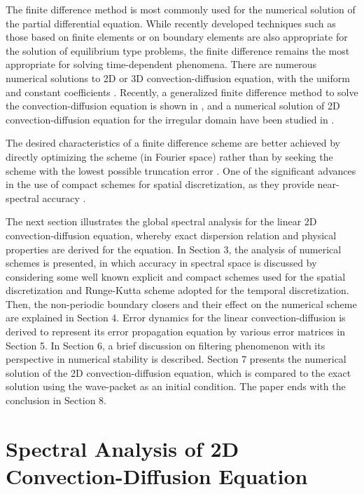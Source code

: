 \documentclass[showpacs,preprintnumbers,amsmath,amssymb]{revtex4-1} %
\begin{document}
The finite difference method is most commonly used for the numerical solution of the partial differential equation. While recently developed techniques such as those based on finite elements \cite{chen2005finite, codina2019finite} or on boundary elements \cite{katsikadelis2002boundary} are also appropriate for the solution of equilibrium type problems, the finite difference remains the most appropriate for solving time-dependent phenomena. There are numerous numerical solutions to 2D or 3D convection-diffusion equation, with the uniform and constant coefficients \cite{thongmoon2006comparison, SUMAN_et_al}. Recently, a generalized finite difference method to solve the convection-diffusion equation is shown in \cite{WANG, URENA, PRIETO}, and a numerical solution of 2D convection-diffusion equation for the irregular domain have been studied in \cite{Kusuma_et_al}.
 
The desired characteristics of a finite difference scheme are better achieved by directly optimizing the scheme (in Fourier space) rather than by seeking the scheme with the lowest possible truncation error \cite{LELE1992}. One of the significant advances in the use of compact schemes for spatial discretization, as they provide near-spectral accuracy \cite{Laizet_et_al, SENGUPTA_et_al_1}.

The next section illustrates the global spectral analysis for the linear 2D convection-diffusion equation, whereby exact dispersion relation and physical properties are derived for the equation. In Section 3, the analysis of numerical schemes is presented, in which accuracy in spectral space is discussed by considering some well known explicit and compact schemes used for the spatial discretization and Runge-Kutta scheme adopted for the temporal discretization. Then, the non-periodic boundary closers and their effect on the numerical scheme are explained in Section 4. Error dynamics for the linear convection-diffusion is derived to represent its error propagation equation by various error matrices in Section 5. In Section 6, a brief discussion on filtering phenomenon with its perspective in numerical stability is described. Section 7 presents the numerical solution of the 2D convection-diffusion equation, which is compared to the exact solution using the wave-packet as an initial condition. The paper ends with the conclusion in Section 8.


\section{Spectral Analysis of 2D Convection-Diffusion Equation}
\end{document}
